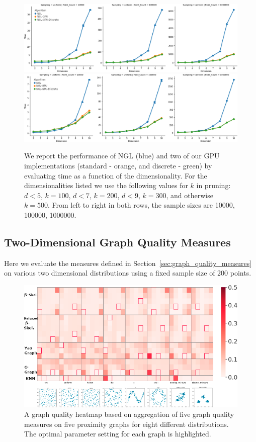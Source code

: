 \begin{figure}[htbp]
    \includegraphics[width=\linewidth]{figs/chap7/strict_performance_d.png}
    \includegraphics[width=\linewidth]{figs/chap7/relaxed_performance_d.png}
    \caption{We report the performance of NGL (blue) and two of our GPU
    implementations (standard - orange, and discrete - green) by
    evaluating time as a function of the dimensionality. For the
    dimensionalities listed we use the following values for $k$ in
    pruning: $d < 5$, $k=100$, $d < 7$, $k=200$, $d < 9$, $k=300$, and
    otherwise $k=500$. From left to right in both rows, the sample sizes
    are 10000, 100000, 1000000.}
    \label{fig:performance}
\end{figure}

\subsection{Two-Dimensional Graph Quality Measures}

Here we evaluate the measures defined in Section~\ref{sec:graph_quality_measures}
on various two dimensional distributions using a fixed sample size of 200 points.

\begin{figure}[htbp]
  \includegraphics[width=\linewidth]{figs/chap7/Combined5graphs.png}
  \caption{A graph quality heatmap based on aggregation of five graph quality measures on five proximity graphs for eight different distributions.
  The optimal parameter setting for each graph is highlighted.}
  \label{fig:teaser}
\end{figure}


